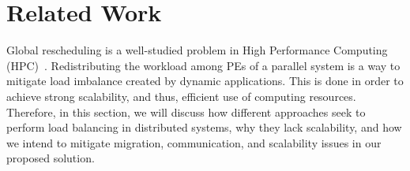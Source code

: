 \section{Related Work} \label{sec:rw}

%

Global rescheduling is a well-studied problem in High Performance Computing (HPC)~\cite{Deveci2015,diffus,grapevine,hwtopo,ZoltanParHypRepart07,Jeannot2016topo,schedmatters2016}.
Redistributing the workload among PEs of a parallel system is a way to mitigate load imbalance created by dynamic applications.
This is done in order to achieve strong scalability, and thus, efficient use of computing resources.
Therefore, in this section, we will discuss how different approaches seek to perform load balancing in distributed systems, why they lack scalability, and how we intend to mitigate migration, communication, and scalability issues in our proposed solution.


